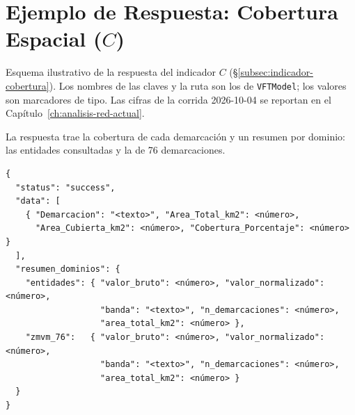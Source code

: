 
\section{Ejemplo de Respuesta: Cobertura Espacial \texorpdfstring{($C$)}{(C)}}
\label{anx:vft-out-cobertura}

Esquema ilustrativo de la respuesta del indicador $C$
(§\ref{subsec:indicador-cobertura}). Los nombres de las claves y la ruta son los
de \texttt{VFTModel}; los valores son marcadores de tipo. Las cifras de la
corrida 2026-10-04 se reportan en el Capítulo~\ref{ch:analisis-red-actual}.

La respuesta trae la cobertura de cada demarcación y un resumen por dominio:
las entidades consultadas y la \zmvm{} de 76 demarcaciones.

\begin{lstlisting}[style=estiloPython,
  caption={Esquema de respuesta del endpoint \texttt{/spatial-coverage}
           (ilustrativo; \texttt{radio\_m} = 800).},
  label=lst:out-cobertura]
{
  "status": "success",
  "data": [
    { "Demarcacion": "<texto>", "Area_Total_km2": <número>,
      "Area_Cubierta_km2": <número>, "Cobertura_Porcentaje": <número> }
  ],
  "resumen_dominios": {
    "entidades": { "valor_bruto": <número>, "valor_normalizado": <número>,
                   "banda": "<texto>", "n_demarcaciones": <número>,
                   "area_total_km2": <número> },
    "zmvm_76":   { "valor_bruto": <número>, "valor_normalizado": <número>,
                   "banda": "<texto>", "n_demarcaciones": <número>,
                   "area_total_km2": <número> }
  }
}
\end{lstlisting}
